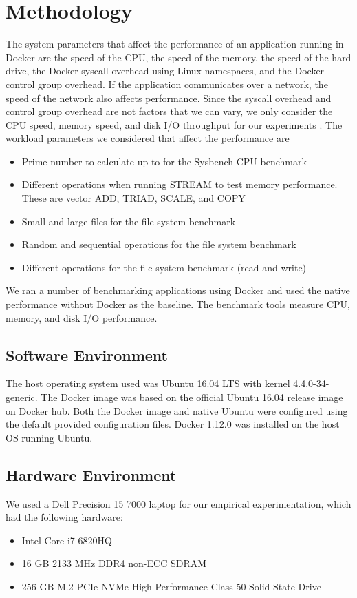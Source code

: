 \documentclass[11pt]{article}
\begin{document}
	\section{Methodology}
	The system parameters that affect the performance of an application running in Docker are the speed of the CPU, the speed of the memory, the speed of the hard drive, the Docker syscall overhead using Linux namespaces, and the Docker control group overhead. If the application communicates over a network, the speed of the network also affects performance. Since the syscall overhead and control group overhead are not factors that we can vary, we only consider the CPU speed, memory speed, and disk I/O throughput for our experiments \cite{bukh}. The workload parameters we considered that affect the performance are
	\begin{itemize}
		\item Prime number to calculate up to for the Sysbench CPU benchmark
		\item Different operations when running STREAM to test memory performance. These are vector ADD, TRIAD, SCALE, and COPY
		\item Small and large files for the file system benchmark
		\item Random and sequential operations for the file system benchmark
		\item Different operations for the file system benchmark (read and write)
	\end{itemize}
	We ran a number of benchmarking applications using Docker and used the native performance without Docker as the baseline. The benchmark tools measure CPU, memory, and disk I/O performance.
	
	\subsection{Software Environment}
	The host operating system used was Ubuntu 16.04 LTS with kernel 4.4.0-34-generic.
	The Docker image was based on the official Ubuntu 16.04 release image on Docker hub.
	Both the Docker image and native Ubuntu were configured using the default provided configuration files. Docker 1.12.0 was installed on the host OS running Ubuntu.
	
	\subsection{Hardware Environment}
	We used a Dell Precision 15 7000 laptop for our empirical experimentation, which had the following hardware:
	\begin{itemize}
		\item Intel Core i7-6820HQ
		\item 16 GB 2133 MHz DDR4 non-ECC SDRAM
		\item 256 GB M.2 PCIe NVMe High Performance Class 50 Solid State Drive
	\end{itemize}
	
\end{document}
